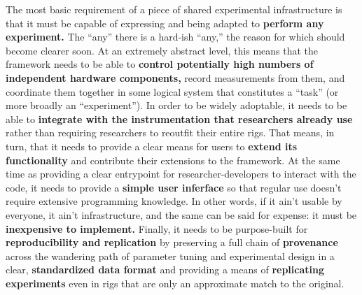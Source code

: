 \documentclass[10pt]{article}
\begin{document}
\begin{multicols}{2}
The most basic requirement of a piece of shared experimental
infrastructure is that it must be capable of expressing and being
adapted to \textbf{perform any experiment.} The ``any'' there is a
hard-ish ``any,'' the reason for which should become clearer soon. At an
extremely abstract level, this means that the framework needs to be able
to \textbf{control potentially high numbers of independent hardware
components,} record measurements from them, and coordinate them together
in some logical system that constitutes a ``task'' (or more broadly an
``experiment''). In order to be widely adoptable, it needs to be able to
\textbf{integrate with the instrumentation that researchers already use}
rather than requiring researchers to reoutfit their entire rigs. That
means, in turn, that it needs to provide a clear means for users to
\textbf{extend its functionality} and contribute their extensions to the
framework. At the same time as providing a clear entrypoint for
researcher-developers to interact with the code, it needs to provide a
\textbf{simple user inferface} so that regular use doesn't require
extensive programming knowledge. In other words, if it ain't usable by
everyone, it ain't infrastructure, and the same can be said for expense:
it must be \textbf{inexpensive to implement.} Finally, it needs to be
purpose-built for \textbf{reproducibility and replication} by preserving
a full chain of \textbf{provenance} across the wandering path of
parameter tuning and experimental design in a clear,
\textbf{standardized data format} and providing a means of
\textbf{replicating experiments} even in rigs that are only an
approximate match to the original.


\end{multicols}
\end{document}
